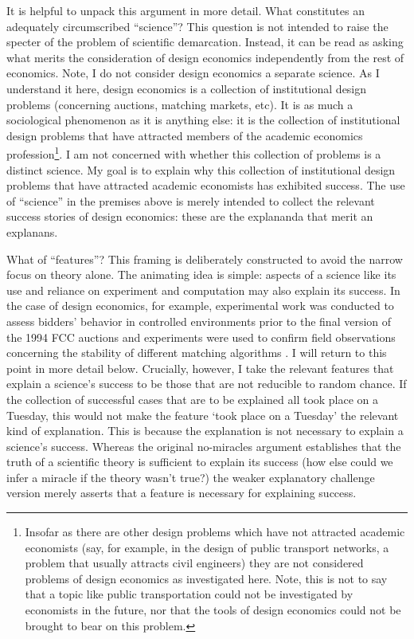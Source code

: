It is helpful to unpack this argument in more detail. What constitutes an adequately circumscribed ``science''? This question is not intended to raise the specter of the problem of scientific demarcation. Instead, it can be read as asking what merits the consideration of design economics independently from the rest of economics. Note, I do not consider design economics a separate science. As I understand it here, design economics is a collection of institutional design problems (concerning auctions, matching markets, etc). It is as much a sociological phenomenon as it is anything else: it is the collection of institutional design problems that have attracted members of the academic economics profession\footnote{Insofar as there are other design problems which have not attracted academic economists (say, for example, in the design of public transport networks, a problem that usually attracts civil engineers) they are not considered problems of design economics as investigated here. Note, this is not to say that a topic like public transportation could not be investigated by economists in the future, nor that the tools of design economics could not be brought to bear on this problem.}. I am not concerned with whether this collection of problems is a distinct science. My goal is to explain why this collection of institutional design problems that have attracted academic economists has exhibited success. The use of ``science'' in the premises above is merely intended to collect the relevant success stories of design economics: these are the explananda that merit an explanans. 

What of ``features''? This framing is deliberately constructed to avoid the narrow focus on theory alone. The animating idea is simple: aspects of a science like its use and reliance on experiment and computation may also explain its success. In the case of design economics, for example, experimental work was conducted to assess bidders' behavior in controlled environments prior to the final version of the 1994 FCC auctions \autocite{plott1997} and experiments were used to confirm field observations concerning the stability of different matching algorithms \autocite{kagel2000}. I will return to this point in more detail below. Crucially, however, I take the relevant features that explain a science's success to be those that are not reducible to random chance. If the collection of successful cases that are to be explained all took place on a Tuesday, this would not make the feature `took place on a Tuesday' the relevant kind of explanation. This is because the explanation is not necessary to explain a science's success. Whereas the original no-miracles argument establishes that the truth of a scientific theory is sufficient to explain its success (how else could we infer a miracle if the theory wasn't true?) the weaker explanatory challenge version merely asserts that a feature is necessary for explaining success. 

